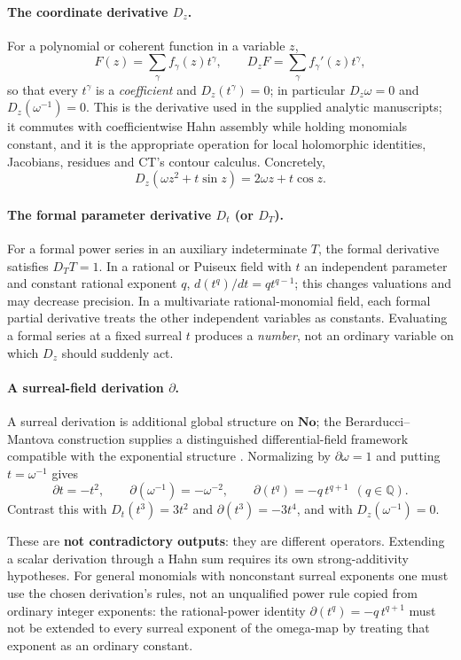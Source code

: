\documentclass[11pt,letterpaper]{article}
\numberwithin{equation}{section}
\theoremstyle{definition}
\theoremstyle{remark}
\newcommand{\No}{\mathbf{No}}
\newcommand{\Q}{\mathbb Q}
\begin{document}
\paragraph{The coordinate derivative $D_z$.}
For a polynomial or coherent function in a variable $z$,
\[
 F(z)=\sum_\gamma f_\gamma(z)t^\gamma,\qquad
 D_zF=\sum_\gamma f_\gamma'(z)t^\gamma ,
\]
so that every $t^\gamma$ is a \emph{coefficient} and $D_z(t^\gamma)=0$; in
particular $D_z\omega=0$ and $D_z(\omega^{-1})=0$. This is the derivative used
in the supplied analytic manuscripts; it commutes with coefficientwise Hahn
assembly while holding monomials constant, and it is the appropriate operation
for local holomorphic identities, Jacobians, residues and CT's contour calculus.
Concretely,
\[
 D_z(\omega z^2+t\sin z)=2\omega z+t\cos z .
\]

\paragraph{The formal parameter derivative $D_t$ (or $D_T$).}
For a formal power series in an auxiliary indeterminate $T$, the formal
derivative satisfies $D_TT=1$. In a rational or Puiseux field with $t$ an
independent parameter and constant rational exponent $q$, $d(t^q)/dt=qt^{q-1}$;
this changes valuations and may decrease precision. In a multivariate
rational-monomial field, each formal partial derivative treats the other
independent variables as constants. Evaluating a formal series at a fixed
surreal $t$ produces a \emph{number}, not an ordinary variable on which $D_z$
should suddenly act.

\paragraph{A surreal-field derivation $\partial$.}
A surreal derivation is additional global structure on $\No$; the
Berarducci--Mantova construction supplies a distinguished differential-field
framework compatible with the exponential structure
\cite{cas:BMDerivations}. Normalizing by $\partial\omega=1$ and putting
$t=\omega^{-1}$ gives
\[
 \partial t=-t^2,\qquad \partial(\omega^{-1})=-\omega^{-2},
 \qquad \partial(t^q)=-q\,t^{q+1}\ \ (q\in\Q).
\]
Contrast this with $D_t(t^3)=3t^2$ and $\partial(t^3)=-3t^4$, and with
$D_z(\omega^{-1})=0$.

These are \textbf{not contradictory outputs}: they are different operators.
Extending a scalar derivation through a Hahn sum requires its own
strong-additivity hypotheses. For general monomials with nonconstant surreal
exponents one must use the chosen derivation's rules, not an unqualified power
rule copied from ordinary integer exponents: the rational-power identity
$\partial(t^q)=-q\,t^{q+1}$ must not be extended to every surreal exponent of
the omega-map by treating that exponent as an ordinary constant.
\end{document}
